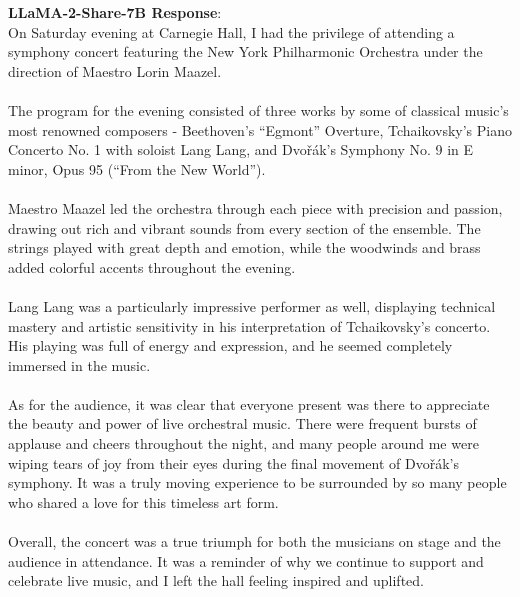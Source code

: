 \documentclass{article} %
\newcommand{\llama}{LLaMA}
\begin{document}
\begin{tcolorbox}[breakable,boxrule=0pt]
  \textbf{\llama{}-2-Share-7B Response}: \\On Saturday evening at Carnegie Hall, I had the privilege of attending a symphony concert featuring the New York Philharmonic Orchestra under the direction of Maestro Lorin Maazel.\\\\The program for the evening consisted of three works by some of classical music's most renowned composers - Beethoven's ``Egmont'' Overture, Tchaikovsky's Piano Concerto No. 1 with soloist Lang Lang, and Dvořák's Symphony No. 9 in E minor, Opus 95 (``From the New World'').\\\\Maestro Maazel led the orchestra through each piece with precision and passion, drawing out rich and vibrant sounds from every section of the ensemble. The strings played with great depth and emotion, while the woodwinds and brass added colorful accents throughout the evening.\\\\Lang Lang was a particularly impressive performer as well, displaying technical mastery and artistic sensitivity in his interpretation of Tchaikovsky's concerto. His playing was full of energy and expression, and he seemed completely immersed in the music.\\\\As for the audience, it was clear that everyone present was there to appreciate the beauty and power of live orchestral music. There were frequent bursts of applause and cheers throughout the night, and many people around me were wiping tears of joy from their eyes during the final movement of Dvořák's symphony. It was a truly moving experience to be surrounded by so many people who shared a love for this timeless art form.\\\\Overall, the concert was a true triumph for both the musicians on stage and the audience in attendance. It was a reminder of why we continue to support and celebrate live music, and I left the hall feeling inspired and uplifted.\\

\end{tcolorbox}
\end{document}
